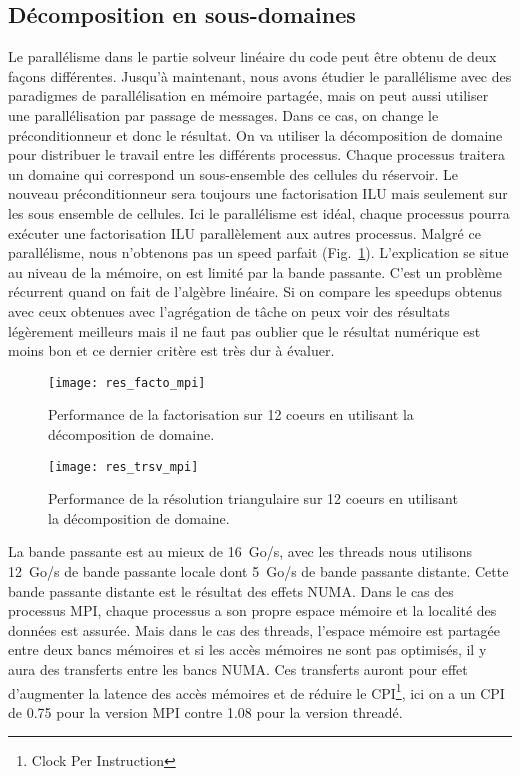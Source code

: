 \subsection{Décomposition en sous-domaines}
Le parallélisme dans le partie solveur linéaire du code peut être obtenu de deux façons différentes.
%
Jusqu'à maintenant, nous avons étudier le parallélisme avec des paradigmes de parallélisation en mémoire partagée, mais on peut aussi utiliser une parallélisation par passage de messages.
%
Dans ce cas, on change le préconditionneur et donc le résultat.
%
On va utiliser la décomposition de domaine pour distribuer le travail entre les différents processus.
%
Chaque processus traitera un domaine qui correspond un sous-ensemble des cellules du réservoir.
%
Le nouveau préconditionneur sera toujours une factorisation ILU mais seulement sur les sous ensemble de cellules.
%
Ici le parallélisme est idéal, chaque processus pourra exécuter une factorisation ILU parallèlement aux autres processus.
%
Malgré ce parallélisme, nous n'obtenons pas un speed parfait (Fig.~\ref{fig:res_facto_mpi}).
%
L'explication se situe au niveau de la mémoire, on est limité par la bande passante.
%
C'est un problème récurrent quand on fait de l'algèbre linéaire.
%
Si on compare les speedups obtenus avec ceux obtenues avec l'agrégation de tâche on peux voir des résultats légèrement meilleurs mais il ne faut pas oublier que le résultat numérique est moins bon et ce dernier critère est très dur à évaluer.


\begin{figure}[t!]
  \centering
  \texttt{[image: res\_facto\_mpi]}
  \caption{Performance de la factorisation sur 12 coeurs en utilisant la décomposition de domaine.}
  \label{fig:res_facto_mpi}
\end{figure}

\begin{figure}[t!]
  \centering
  \texttt{[image: res\_trsv\_mpi]}
  \caption{Performance de la résolution triangulaire sur 12 coeurs en utilisant la décomposition de domaine.}
  \label{fig:res_trsv_mpi}
\end{figure}


La bande passante est au mieux de 16~Go/s, avec les threads nous utilisons 12~Go/s de bande passante locale dont 5~Go/s de bande passante distante.
%
Cette bande passante distante est le résultat des effets NUMA.
%
Dans le cas des processus MPI, chaque processus a son propre espace mémoire et la localité des données est assurée.
%
Mais dans le cas des threads, l'espace mémoire est partagée entre deux bancs mémoires et si les accès mémoires ne sont pas optimisés, il y aura des transferts entre les bancs NUMA.
%
Ces transferts auront pour effet d'augmenter la latence des accès mémoires et de réduire le CPI\footnote{Clock Per Instruction}, ici on a un CPI de 0.75 pour la version MPI contre 1.08 pour la version threadé.


